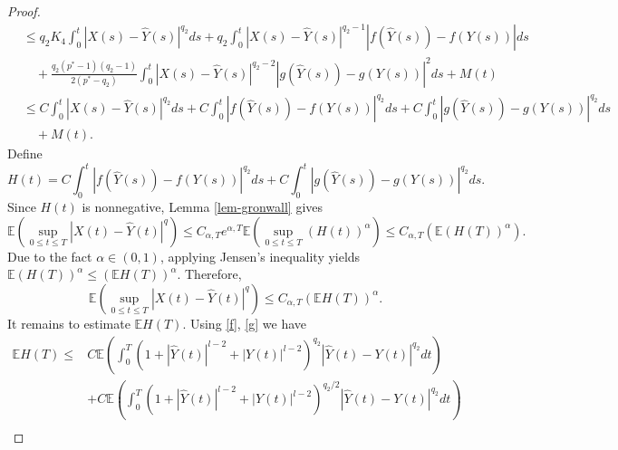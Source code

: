 \documentclass[preprint,12pt,compress]{elsarticle}
\begin{document}
\begin{proof}
\begin{equation*}
\begin{split}
		&\le {q_2}{K_4}\int_0^t {{{\left| {X(s) - \hat Y(s)} \right|}^{q_2}}ds}  + q_2\int_0^t {{{\left| {X(s) - \hat Y(s)} \right|}^{{q_2} - 1}}\left| {f(\hat Y(s)) - f( Y(s))} \right|ds} \\
		&\quad+ \frac{{q_2({p^*} - 1)({q_2} - 1)}}{{2({p^*} - {q_2})}}\int_0^t {{{\left| {X(s) - \hat Y(s)} \right|}^{{q_2} - 2}}{{\left| {g(\hat Y(s)) - g( Y(s))} \right|}^2}ds}+ M(t) \\
		&\le C\int_0^t {{{\left| {X(s) - \hat Y(s)} \right|}^{q_2}}ds}+ C\int_0^t {{{\left| {f(\hat Y(s)) - f( Y(s))} \right|}^{q_2}}ds}  + C\int_0^t {{{\left| {g(\hat Y(s)) - g( Y(s))} \right|}^{q_2}}ds} \\
		&\quad + M(t) .
	\end{split}
\end{equation*}
Define 
\begin{equation}  \label{ac7}
	H(t) = C\int_0^t {{{\left| {f(\hat Y(s)) - f( Y(s))} \right|}^{q_2}}ds}  + C\int_0^t {{{\left| {g(\hat Y(s)) - g( Y(s))} \right|}^{q_2}}ds}.
\end{equation}
Since $H(t)$ is nonnegative, Lemma \ref{lem-gronwall} gives
\begin{equation*} 
	\mathbb{E}\left( {\mathop {\sup }\limits_{0 \le t \le T} {{\left| {X(t) - \hat Y(t)} \right|}^q}} \right) \le {C_{\alpha ,T}}{e^{\alpha ,T}}\mathbb{E}\left( {\mathop {\sup }\limits_{0 \le t \le T} {{\left( {H(t)} \right)}^\alpha }} \right) \le {C_{\alpha ,T}}\left( {\mathbb{E}{{\left( {H(T)} \right)}^\alpha }} \right).
\end{equation*}
Due to the fact $\alpha \in (0, 1)$, applying Jensen's inequality yields $\mathbb{E}{\left( {H(T)} \right)^\alpha } \le {\left( {\mathbb{E}H(T)} \right)^\alpha }$. Therefore,
\begin{equation}   \label{ac6}
	\mathbb{E}\left( {\mathop {\sup }\limits_{0 \le t \le T} {{\left| {X(t) - \hat Y(t)} \right|}^q}} \right) \le C_{\alpha,T}{\left( {\mathbb{E}H(T)} \right)^\alpha } .
\end{equation}
It remains to estimate $\mathbb{E}H(T)$.
Using \eqref{f}, \eqref{g} we have
\begin{equation}  \label{ac4}
\begin{split}
	\mathbb{E}H(T) 
	\le& C\mathbb{E}\left( {\int_0^T {{{\left( {1 + {{\left| {\hat Y(t)} \right|}^{l - 2}} + {{\left| {Y(t)} \right|}^{l - 2}}} \right)}^{{q_2}}}{{\left| {\hat Y(t) - Y(t)} \right|}^{{q_2}}}dt} } \right) \\
	&+ C\mathbb{E}\left( {\int_0^T {{{\left( {1 + {{\left| {\hat Y(t)} \right|}^{l - 2}} + {{\left| {Y(t)} \right|}^{l - 2}}} \right)}^{{q_2}/{2}}}{{\left| {\hat Y(t) - Y(t)} \right|}^{{q_2}}}dt} } \right) \\

\end{split}
\end{equation}
\end{proof}
\end{document}
